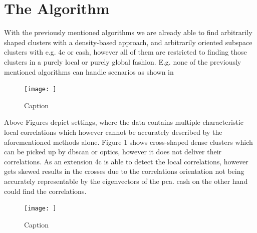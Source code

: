 \section{The Algorithm}
With the previously mentioned algorithms we are already able to find arbitrarily shaped clusters with a density-based approach, and arbitrarily oriented subspace clusters with e.g. \gls{4c} or \gls{cash}, however all of them are restricted to finding those clusters in a purely local or purely global fashion. E.g. none of the previously mentioned algorithms can handle scenarios as shown in 
\begin{figure}
    \centering
    \texttt{[image: ]}
    \caption{Caption}
    \label{fig:}
\end{figure}
Above Figures  depict settings, where the data contains multiple characteristic local correlations which however cannot be accurately described by the aforementioned methods alone. Figure 1 shows cross-shaped dense clusters which can be picked up by \gls{dbscan} or \gls{optics}, however it does not deliver their correlations. As an extension \gls{4c} is able to detect the local correlations, however gets skewed results in the crosses due to the correlations orientation not being accurately representable by the eigenvectors of the \gls{pca}\cite{PCAshlens2014tutorial}. 
\gls{cash} on the other hand could find the correlations. 

\begin{figure}
    \centering
    \texttt{[image: ]}
    \caption{Caption}
    \label{fig:localglobalproblem}
\end{figure}

